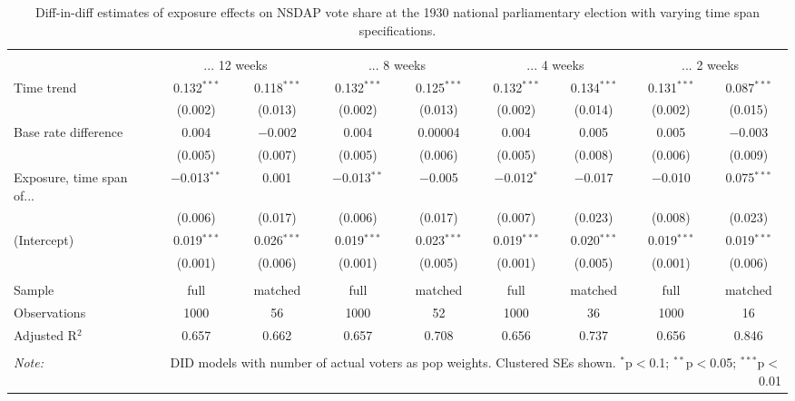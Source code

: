
\begin{table}[!htbp] \centering 
  \caption{Diff-in-diff estimates of exposure effects on NSDAP vote share at the 1930 national parliamentary election with varying time span specifications.\vspace{-.25cm}} 
  \label{tab:nsdap-voteshare-timespan-dd-1930} 
\scriptsize 
\begin{tabular}{@{\extracolsep{5pt}}lcccccccc} 
\\[-1.8ex]\hline 
\hline \\[-1.8ex] 
 & \multicolumn{2}{c}{... 12 weeks} & \multicolumn{2}{c}{... 8 weeks} & \multicolumn{2}{c}{... 4 weeks} & \multicolumn{2}{c}{... 2 weeks} \\ 
 \cmidrule(r){2-3}\cmidrule(r){4-5}\cmidrule(r){6-7}\cmidrule(r){8-9}Time trend & 0.132$^{***}$ & 0.118$^{***}$ & 0.132$^{***}$ & 0.125$^{***}$ & 0.132$^{***}$ & 0.134$^{***}$ & 0.131$^{***}$ & 0.087$^{***}$ \\ 
  & (0.002) & (0.013) & (0.002) & (0.013) & (0.002) & (0.014) & (0.002) & (0.015) \\ 
  Base rate difference & 0.004 & $-$0.002 & 0.004 & 0.00004 & 0.004 & 0.005 & 0.005 & $-$0.003 \\ 
  & (0.005) & (0.007) & (0.005) & (0.006) & (0.005) & (0.008) & (0.006) & (0.009) \\ 
  Exposure, time span of... & $-$0.013$^{**}$ & 0.001 & $-$0.013$^{**}$ & $-$0.005 & $-$0.012$^{*}$ & $-$0.017 & $-$0.010 & 0.075$^{***}$ \\ 
  & (0.006) & (0.017) & (0.006) & (0.017) & (0.007) & (0.023) & (0.008) & (0.023) \\ 
  (Intercept) & 0.019$^{***}$ & 0.026$^{***}$ & 0.019$^{***}$ & 0.023$^{***}$ & 0.019$^{***}$ & 0.020$^{***}$ & 0.019$^{***}$ & 0.019$^{***}$ \\ 
  & (0.001) & (0.006) & (0.001) & (0.005) & (0.001) & (0.005) & (0.001) & (0.006) \\ 
 \hline \\[-1.8ex] 
Sample & full & matched & full & matched & full & matched & full & matched \\ 
Observations & 1000 & 56 & 1000 & 52 & 1000 & 36 & 1000 & 16 \\ 
Adjusted R$^{2}$ & 0.657 & 0.662 & 0.657 & 0.708 & 0.656 & 0.737 & 0.656 & 0.846 \\ 
\hline 
\hline \\[-1.8ex] 
\textit{Note:}  & \multicolumn{8}{r}{DID models with number of actual voters as pop weights. Clustered SEs shown. $^{*}$p$<$0.1; $^{**}$p$<$0.05; $^{***}$p$<$0.01} \\ 
\end{tabular} 
\end{table} 
